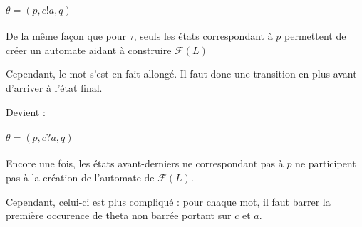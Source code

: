 \paragraph{$\theta=(p,c!a,q)$}

De la même façon que pour $\tau$, seuls les états correspondant à $p$ permettent de créer un automate aidant à construire $\mathcal{F}(L)$

Cependant, le mot s'est en fait allongé. Il faut donc une transition en plus avant d'arriver à l'état final.


\begin{figure}[H]
    \centering
\end{figure}

Devient :

\begin{figure}[H]
    \centering
\end{figure}

\paragraph{$\theta=(p,c?a,q)$}

Encore une fois, les états avant-derniers ne correspondant pas à $p$ ne participent pas à la création de l'automate de $\mathcal{F}(L)$.

Cependant, celui-ci est plus compliqué : pour chaque mot, il faut barrer la première occurence de theta non barrée portant sur $c$ et $a$.

